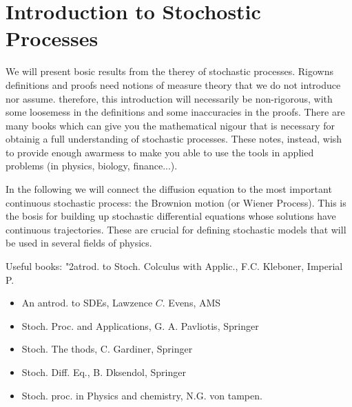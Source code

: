 \documentclass[10pt]{article}
\begin{document}
\section*{Introduction to Stochostic Processes}
We will present bosic results from the therey of stochastic processes. Rigowns definitions and proofs need notions of measure theory that we do not introduce nor assume. therefore, this introduction will necessarily be non-rigorous, with some loosemess in the definitions and some inaccuracies in the proofs. There are many books which can give you the mathematical nigour that is necessary for obtainig a full understanding of stochastic processes. These notes, instead, wish to provide enough awarmess to make you able to use the tools in applied problems (in physics, biology, finance...).

In the following we will connect the diffusion equation to the most important continuous stochastic process: the Brownion motion (or Wiener Process). This is the bosis for building up stochastic differential equations whose solutions have continuous trajectories. These are crucial for defining stochastic models that will be used in several fields of physics.

Useful books: "2atrod. to Stoch. Colculus with Applic., F.C. Kleboner, Imperial P.

\begin{itemize}
  \item An antrod. to SDEs, Lawzence $C$. Evens, AMS
  \item Stoch. Proc. and Applications, G. A. Pavliotis, Springer
  \item Stoch. The thods, C. Gardiner, Springer
  \item Stoch. Diff. Eq., B. Dksendol, Springer
  \item Stoch. proc. in Physics and chemistry, N.G. von tampen.
\end{itemize}
\end{document}
